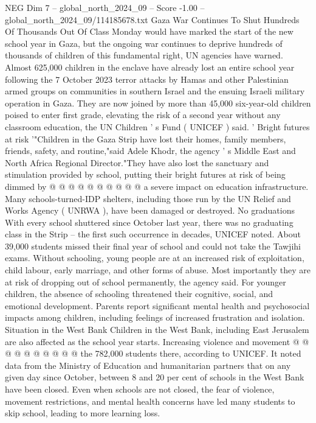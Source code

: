 \begin{textsample}{NEG Dim 7 – global\_north\_2024\_09 – Score -1.00 – global\_north\_2024\_09/114185678.txt}  \label{ex:f7_neg_380}
Gaza War Continues To Shut Hundreds Of Thousands Out Of Class Monday would have marked the start of the new school year in Gaza, but the ongoing war continues to deprive hundreds of thousands of children of this fundamental right, UN agencies have warned.
Almost 625,000 children in the enclave have already lost an entire school year following the 7 October 2023 terror attacks by Hamas and other Palestinian armed groups on communities in southern Israel and the ensuing Israeli military operation in Gaza.
They are now joined by more than 45,000 six-year-old children poised to enter first grade, elevating the risk of a second year without any classroom education, the UN Children ' s Fund ( UNICEF ) said. ' Bright futures at risk '"Children in the Gaza Strip have lost their homes, family members, friends, safety, and routine,"said Adele Khodr, the agency ' s Middle East and North Africa Regional Director."They have also lost the sanctuary and stimulation provided by school, putting their bright futures at risk of being dimmed by @ @ @ @ @ @ @ @ @ @ a severe impact on education infrastructure.
Many schools-turned-IDP shelters, including those run by the UN Relief and Works Agency ( UNRWA ), have been damaged or destroyed.
No graduations With every school shuttered since October last year, there was no graduating class in the Strip -- the first such occurrence in decades, UNICEF noted.
About 39,000 students missed their final year of school and could not take the Tawjihi exams.
Without schooling, young people are at an increased risk of exploitation, child labour, early marriage, and other forms of abuse.
Most importantly they are at risk of dropping out of school permanently, the agency said.
For younger children, the absence of schooling threatened their cognitive, social, and emotional development.
Parents report significant mental health and psychosocial impacts among children, including feelings of increased frustration and isolation.
Situation in the West Bank Children in the West Bank, including East Jerusalem are also affected as the school year starts.
Increasing violence and movement @ @ @ @ @ @ @ @ @ @ the 782,000 students there, according to UNICEF.
It noted data from the Ministry of Education and humanitarian partners that on any given day since October, between 8 and 20 per cent of schools in the West Bank have been closed.
Even when schools are not closed, the fear of violence, movement restrictions, and mental health concerns have led many students to skip school, leading to more learning loss.

\end{textsample}
